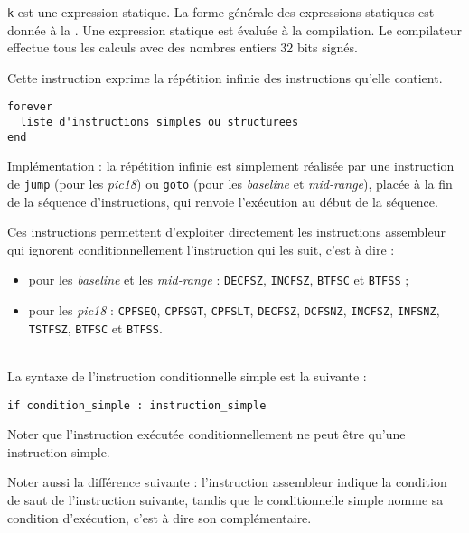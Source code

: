 \texttt{k} est une expression statique. La forme générale des expressions statiques est donnée à la . Une expression statique est évaluée à la compilation. Le compilateur effectue tous les calculs avec des nombres entiers 32 bits signés.



Cette instruction exprime la répétition infinie des instructions qu'elle contient.
\begin{lstlisting}[language=piccolo]
forever
  liste d'instructions simples ou structurees
end
\end{lstlisting}

Implémentation : la répétition infinie est simplement réalisée par une instruction de \texttt{jump} (pour les \emph{pic18}) ou \texttt{goto} (pour les \emph{baseline} et \emph{mid-range}), placée à la fin de la séquence d'instructions, qui renvoie l'exécution au début de la séquence.




Ces instructions permettent d’exploiter directement les instructions assembleur qui ignorent conditionnellement l’instruction qui les suit, c’est à dire :
\begin{itemize}
\item pour les \emph{baseline} et les \emph{mid-range} : \texttt{DECFSZ}, \texttt{INCFSZ}, \texttt{BTFSC} et \texttt{BTFSS} ;
\item pour les \emph{pic18} : \texttt{CPFSEQ}, \texttt{CPFSGT}, \texttt{CPFSLT}, \texttt{DECFSZ}, \texttt{DCFSNZ}, \texttt{INCFSZ}, \texttt{INFSNZ}, \texttt{TSTFSZ}, \texttt{BTFSC} et \texttt{BTFSS}.
\end{itemize}

~\\
La syntaxe de l’instruction conditionnelle simple est la suivante :

\begin{lstlisting}[language=piccolo]
if condition_simple : instruction_simple
\end{lstlisting}

Noter que l’instruction exécutée conditionnellement ne peut être qu’une instruction simple.

Noter aussi la différence suivante : l’instruction assembleur indique la condition de saut de l’instruction suivante, tandis que le conditionnelle simple nomme sa condition d’exécution, c’est à dire son complémentaire.

